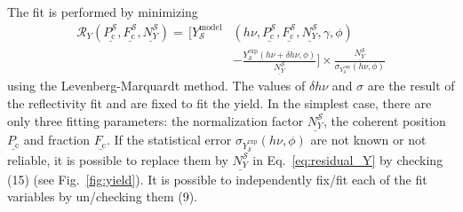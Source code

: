 \documentclass[oldfontcommands,openany,oneside]{memoir}
\begin{document}
The fit is performed by minimizing
\begin{align} \label{eq:residual_Y}
  \mathcal{R}_Y(\underline{P_\mathrm{c}^\mathscr{S}}, \underline{F_\mathrm{c}^\mathscr{S}}, \underline{N_Y^\mathscr{S}})  = \, \bigg[Y^\mathrm{model}_\mathscr{S}& \left(h\nu, \underline{P_\mathrm{c}^\mathscr{S}}, \underline{F_\mathrm{c}^\mathscr{S}}, \underline{N_Y^\mathscr{S}}, \gamma, \phi\right) \nonumber \\
  & - \frac{Y^\mathrm{exp}_\mathscr{S}(h\nu+ \delta h\nu, \phi)}{\underline{N_Y^\mathscr{S}}}\bigg]\times\frac{\underline{N_Y^\mathscr{S}}}{\sigma_{Y^\mathrm{exp}_\mathscr{S}}(h\nu, \phi)}
\end{align}
using the Levenberg-Marquardt method. The values of $\delta h\nu$ and $\sigma$ are the result of the reflectivity fit and are fixed to fit the yield. In the simplest case, there are only three fitting parameters: the normalization factor $\underline{N_Y^\mathscr{S}}$, the coherent position $\underline{P_\mathrm{c}}$ and fraction $\underline{F_\mathrm{c}}$. If the statistical error $\sigma_{Y^\mathrm{exp}_\mathscr{S}}(h\nu, \phi)$ are not known or not reliable, it is possible to replace them by $\underline{N_Y^\mathscr{S}}$ in Eq.~\ref{eq:residual_Y} by checking  (15) (see Fig.~\ref{fig:yield}). It is possible to independently fix/fit each of the fit variables by un/checking them (9).
\end{document}
